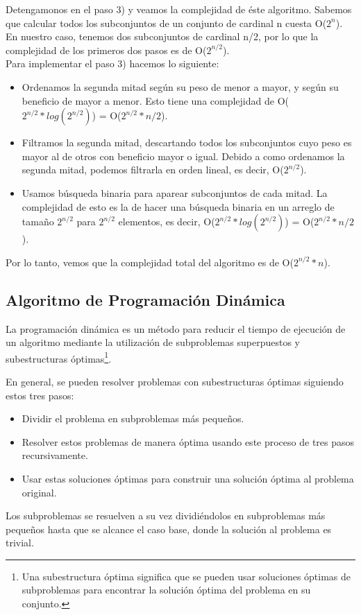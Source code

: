 Detengamonos en el paso 3) y veamos la complejidad de éste algoritmo. Sabemos que calcular todos los subconjuntos de un conjunto de cardinal n cuesta O($2^{n}$). En nuestro caso, tenemos dos subconjuntos de cardinal n/2, por lo que la complejidad de los primeros dos pasos es de O($2^{n/2}$). \\
Para implementar el paso 3) hacemos lo siguiente:
\begin{itemize}
\item Ordenamos la segunda mitad según su peso de menor a mayor, y según su beneficio de mayor a menor. Esto tiene una complejidad de O($2^{n/2} * log(2^{n/2})$) = O($2^{n/2} * n/2$).
\item Filtramos la segunda mitad, descartando todos los subconjuntos cuyo peso es mayor al de otros con beneficio mayor o igual. Debido a como ordenamos la segunda mitad, podemos filtrarla en orden lineal, es decir, O($2^{n/2}$).
\item Usamos búsqueda binaria para aparear subconjuntos de cada mitad. La complejidad de esto es la de hacer una búsqueda binaria en un arreglo de tamaño $2^{n/2}$ para $2^{n/2}$ elementos, es decir, O($2^{n/2} * log(2^{n/2})$) = O($2^{n/2} * n/2$).
\end{itemize}

\bigskip

Por lo tanto, vemos que la complejidad total del algoritmo es de O($2^{n/2} * n$).

\subsection{Algoritmo de Programación Dinámica}
La programación dinámica es un método para reducir el tiempo de ejecución de un algoritmo mediante la utilización de subproblemas superpuestos y subestructuras óptimas\footnote{Una subestructura óptima significa que se pueden usar soluciones óptimas de subproblemas para encontrar la solución óptima del problema en su conjunto.}.


En general, se pueden resolver problemas con subestructuras óptimas siguiendo estos tres pasos:
\begin{itemize}
	\item Dividir el problema en subproblemas más pequeños.
	\item Resolver estos problemas de manera óptima usando este proceso de tres pasos recursivamente.
	\item Usar estas soluciones óptimas para construir una solución óptima al problema original.
\end{itemize}
Los subproblemas se resuelven a su vez dividiéndolos en subproblemas más pequeños hasta que se alcance el caso base, donde la solución al problema es trivial.


